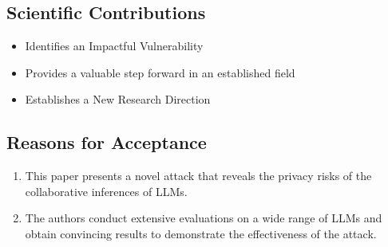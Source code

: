 \subsection{Scientific Contributions}
\begin{itemize}
\item Identifies an Impactful Vulnerability
\item Provides a valuable step forward in an established field
\item Establishes a New Research Direction
\end{itemize}

\subsection{Reasons for Acceptance}
\begin{enumerate}
\item This paper presents a novel attack that reveals the privacy risks of the collaborative inferences of LLMs. 
\item The authors conduct extensive evaluations on a wide range of LLMs and obtain convincing results to demonstrate the effectiveness of the attack.
\end{enumerate}


